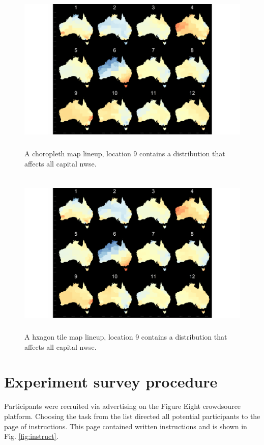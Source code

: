 \documentclass{monashthesis}
\begin{document}
\begin{figure}[H]
\centering
\includegraphics[height=8cm]{lineups/nwse-geo6-1.pdf}
\caption{\label{fig:nwse-geo6}A choropleth map lineup, location 9 contains a distribution that affects all capital nwse.}
\end{figure}

\begin{figure}[H]
\centering
\includegraphics[height=8cm]{lineups/nwse-hex6-1.pdf}
\caption{\label{fig:nwse-hex6}A hxagon tile map lineup, location 9 contains a distribution that affects all capital nwse.}
\end{figure}

\hypertarget{experiment-survey-procedure}{%
\chapter{Experiment survey procedure}\label{experiment-survey-procedure}}

Participants were recruited via advertising on the Figure Eight crowdsource platform.
Choosing the task from the list directed all potential participants to the page of instructions.
This page contained written instructions and is shown in Fig. \ref{fig:instruct}.
\end{document}
